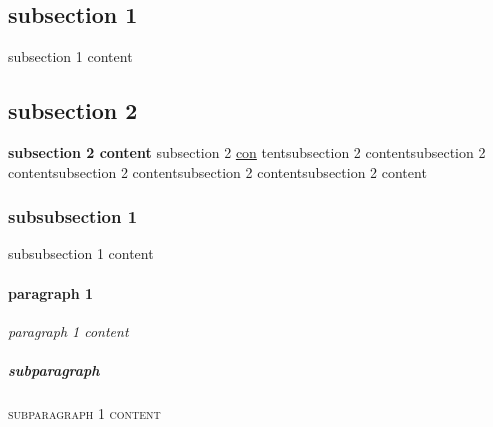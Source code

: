 \documentclass[10pt,a4paper,notitlepage,onecolumn]{article}
\begin{document}
            \subsection{subsection 1}
            \tiny   %
            \textrm{subsection 1 content}
            \subsection{subsection 2}
            \huge
            \textbf{subsection 2 content}   %
            subsection 2 \newline
            \underline{con} %
            tentsubsection 2 contentsubsection 2 contentsubsection 2 contentsubsection 2 contentsubsection 2 content
                \subsubsection*{subsubsection 1}    %
                \textsf{subsubsection 1 content}
                    \paragraph{paragraph 1}
                    \textit{paragraph 1 content}    %
                    \\
                        \subparagraph{subparagraph}
                        \textsc{subparagraph 1 content}
\end{document}
